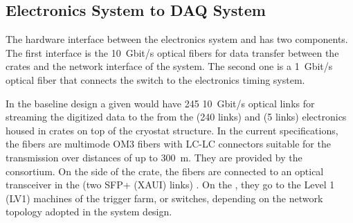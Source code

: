 \subsection{Electronics System to DAQ System}
\label{sec:fddp-tpc-elec-intfc-daq}

The hardware interface between the \dual electronics system and  has two components. The first interface is the \SI{10}{Gbit/s} optical fibers for data transfer between the  crates and the network interface of the  system. The second one is a \SI{1}{Gbit/s} optical fiber that connects the   switch to the \dual electronics timing system.   

In the baseline design 
a given  would have \num{245} \SI{10}{Gbit/s} optical links for streaming the digitized data to the  from the  (\num{240} links) and  (\num{5} links) electronics housed in  crates on top of the cryostat structure.  In the current specifications, the fibers are multimode OM3 fibers \cite{om3fibers} with LC-LC connectors suitable for the transmission over distances of up to \SI{300}{\metre}.  They are provided by the  consortium. On the side of the  crate, the fibers are connected to an optical transceiver in the  (two SFP+ (XAUI) links) \cite{natmch}.  On the , they go to the Level 1 (LV1) machines of the trigger farm, or switches, depending on the network topology adopted in the  system design.

